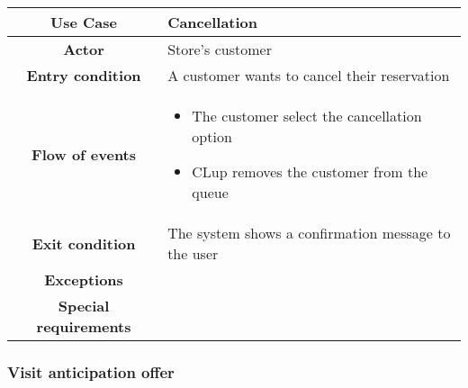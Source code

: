 \documentclass[../../main.tex]{subfiles}
\begin{document}
      \begin{table}[H]
        \centering
          \begin{tabular}{c m{}}
          \hline
          \textbf{Use Case} & Cancellation\\ \hline
          \textbf{Actor} & Store's customer\\ \hline
          \textbf{Entry condition} & A customer wants to cancel their reservation\\  \hline
          \textbf{Flow of events} & \begin{itemize}
                                      \item The customer select the cancellation option
                                      \item CLup removes the customer from the queue
                                    \end{itemize}\\ \hline
          \textbf{Exit condition} & The system shows a confirmation message to the user \\ \hline
          \textbf{Exceptions} &\\ \hline
          \textbf{Special requirements} &\\ \hline
          \end{tabular}
      \end{table}
      
      \subsubsection{Visit anticipation offer}
\end{document}
